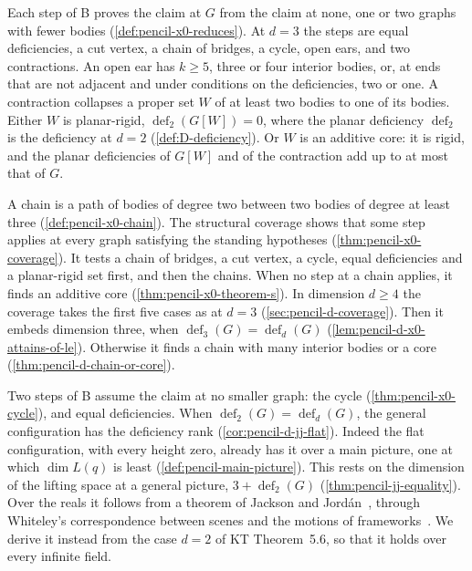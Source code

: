 Each step of B proves the claim at $G$ from the claim at none, one or
two graphs with fewer bodies (\cref{def:pencil-x0-reduces}). At $d = 3$
the steps are equal deficiencies, a cut vertex, a chain of bridges, a
cycle, open ears, and two contractions. An open ear has $k \ge 5$, three
or four interior bodies, or, at ends that are not adjacent and under
conditions on the deficiencies, two or one. A contraction collapses a
proper set $W$ of at least two bodies to one of its bodies. Either $W$
is planar-rigid, $\operatorname{def}_2(G[W]) = 0$, where the planar
deficiency $\operatorname{def}_2$ is the deficiency at $d = 2$
(\cref{def:D-deficiency}). Or $W$ is an additive core: it is rigid, and
the planar deficiencies of $G[W]$ and of the contraction add up to at
most that of $G$.

A chain is a path of bodies of degree two between two bodies of degree
at least three (\cref{def:pencil-x0-chain}). The structural coverage
shows that some step applies at every graph satisfying the standing
hypotheses (\cref{thm:pencil-x0-coverage}). It tests a chain of bridges,
a cut vertex, a cycle, equal deficiencies and a planar-rigid set first,
and then the chains. When no step at a chain applies, it finds an
additive core (\cref{thm:pencil-x0-theorem-s}). In dimension $d \ge 4$
the coverage takes the first five cases as at $d = 3$
(\cref{sec:pencil-d-coverage}). Then it embeds dimension three, when
$\operatorname{def}_3(G) = \operatorname{def}_d(G)$
(\cref{lem:pencil-d-x0-attains-of-le}). Otherwise it finds a chain with
many interior bodies or a core (\cref{thm:pencil-d-chain-or-core}).

Two steps of B assume the claim at no smaller graph: the cycle
(\cref{thm:pencil-x0-cycle}), and equal deficiencies. When
$\operatorname{def}_2(G) = \operatorname{def}_d(G)$, the general
configuration has the deficiency rank (\cref{cor:pencil-d-jj-flat}).
Indeed the flat configuration, with every height zero, already has it
over a main picture, one at which $\dim L(q)$ is least
(\cref{def:pencil-main-picture}). This rests on the dimension of the
lifting space at a general picture, $3 + \operatorname{def}_2(G)$
(\cref{thm:pencil-jj-equality}). Over the reals it follows from a
theorem of Jackson and Jord\'an~\cite[Theorem~7.1]{jacksonJordan2006pin},
through Whiteley's correspondence between scenes and the motions of
frameworks~\cite{whiteley1984}. We derive it instead from the case
$d = 2$ of KT Theorem~5.6, so that it holds over every infinite field.

